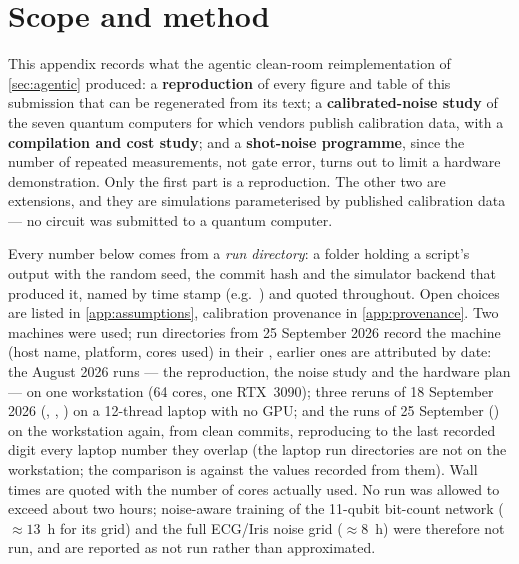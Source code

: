 
\section{Scope and method}
\label{app:agentic}

This appendix records what the agentic clean-room reimplementation of \cref{sec:agentic}
produced: a \textbf{reproduction} of every figure and table of this submission that can be
regenerated from its text; a \textbf{calibrated-noise study} of the seven quantum computers for
which vendors publish calibration data, with a \textbf{compilation and cost study}; and a
\textbf{shot-noise programme}, since the number of repeated measurements, not gate error, turns
out to limit a hardware demonstration.  Only the first part is a reproduction.  The other two
are extensions, and they are simulations parameterised by published calibration data --- no
circuit was submitted to a quantum computer.

Every number below comes from a \emph{run directory}: a folder holding a script's output with
the random seed, the commit hash and the simulator backend that produced it, named by time
stamp (e.g.\ ) and quoted throughout.  Open choices are
listed in \cref{app:assumptions}, calibration provenance in \cref{app:provenance}.  Two
machines were used; run directories from 25 September 2026 record the machine (host name,
platform, cores used) in their , earlier ones are attributed by date: the August
2026 runs --- the
reproduction, the noise study and the hardware plan --- on one workstation (64 cores, one
RTX~3090); three reruns of 18 September 2026 (,
, ) on a 12-thread laptop with no GPU;
and the runs of 25 September () on the workstation again, from clean commits,
reproducing to the last recorded digit every laptop number they overlap (the laptop run
directories are not on the workstation; the comparison is against the values recorded from them).  Wall times are quoted with the
number of cores actually used.  No run was allowed to exceed about
two hours; noise-aware training of the 11-qubit bit-count network ($\approx13$~h for its grid)
and the full ECG/Iris noise grid ($\approx8$~h) were therefore not run, and are reported as not
run rather than approximated.


